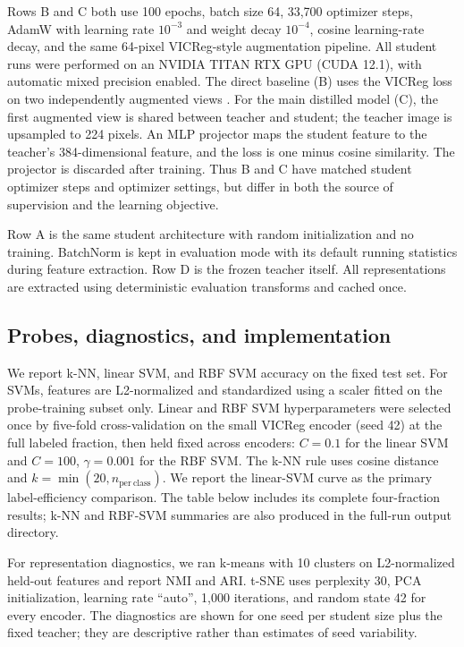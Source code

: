 \documentclass[10pt]{article}
\begin{document}
Rows B and C both use 100 epochs, batch size 64, 33,700 optimizer steps,
AdamW with learning rate $10^{-3}$ and weight decay $10^{-4}$, cosine
learning-rate decay, and the same 64-pixel VICReg-style augmentation
pipeline. All student runs were performed on an NVIDIA TITAN RTX GPU
(CUDA 12.1), with automatic mixed precision enabled. The direct baseline
(B) uses the VICReg loss on two independently
augmented views \cite{vicreg}. For the main distilled model (C), the first
augmented view is shared between teacher and student; the teacher image is
upsampled to 224 pixels. An MLP projector maps the student feature to the
teacher's 384-dimensional feature, and the loss is one minus cosine
similarity. The projector is discarded after training. Thus B and C have
matched student optimizer steps and optimizer settings, but differ in both
the source of supervision and the learning objective.

Row A is the same student architecture with random initialization and no
training. BatchNorm is kept in evaluation mode with its default running
statistics during feature extraction. Row D is the frozen teacher itself.
All representations are extracted using deterministic evaluation
transforms and cached once.

\subsection{Probes, diagnostics, and implementation}

We report k-NN, linear SVM, and RBF SVM accuracy on the fixed test set.
For SVMs, features are L2-normalized and standardized using a scaler fitted
on the probe-training subset only. Linear and RBF SVM hyperparameters were
selected once by five-fold cross-validation on the small VICReg encoder
(seed 42) at the full labeled fraction, then held fixed across encoders:
$C=0.1$ for the linear SVM and $C=100$, $\gamma=0.001$ for the RBF SVM.
The k-NN rule uses cosine distance and
$k=\min(20,n_{\mathrm{per\ class}})$. We report the linear-SVM curve as the
primary label-efficiency comparison. The table below includes its complete
four-fraction results; k-NN and RBF-SVM summaries are also produced in the
full-run output directory.

For representation diagnostics, we ran k-means with 10 clusters on
L2-normalized held-out features and report NMI and ARI. t-SNE uses
perplexity 30, PCA initialization, learning rate ``auto'', 1,000
iterations, and random state 42 for every encoder. The diagnostics are
shown for one seed per student size plus the fixed teacher; they are
descriptive rather than estimates of seed variability.
\end{document}
